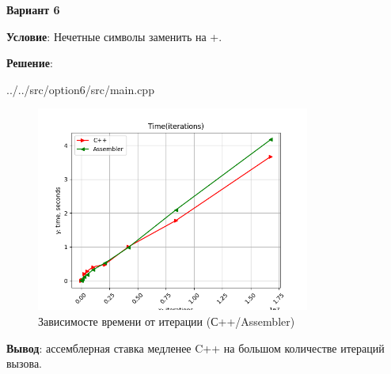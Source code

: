 \newpage

\begin{center}
    \textbf{Вариант 6}
\end{center}

\textbf{Условие}:
Нечетные символы заменить на +.

\textbf{Решение}:


{../../src/option6/src/main.cpp}

\begin{figure}[!htp]
    \centering
    \includegraphics[width=9cm]
    {../_INCLUDES/option6.png}
    \caption{Зависимосте времени от итерации (С++/Assembler)}
\end{figure}

\textbf{Вывод}: ассемблерная ставка медленее C++ на большом количестве итераций вызова.

\newpage

